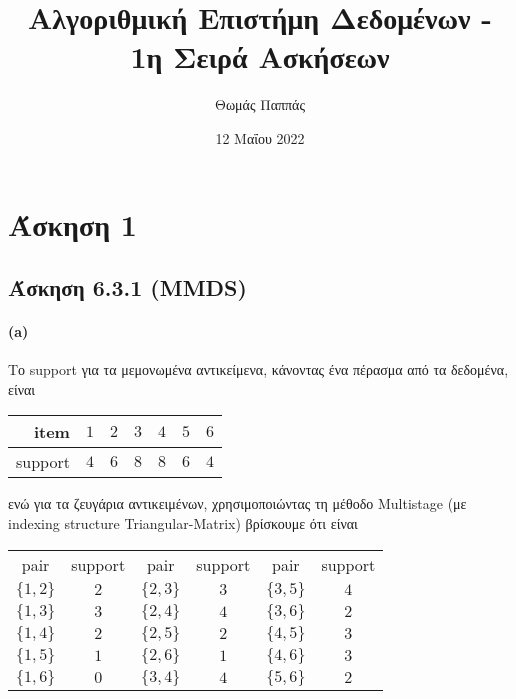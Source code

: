 \documentclass[a4paper,11pt]{article}
\begin{document}
\title{Αλγοριθμική Επιστήμη Δεδομένων - 1η Σειρά Ασκήσεων}
\author{Θωμάς Παππάς}
\date{12 Μαΐου 2022}
\maketitle

\section*{Άσκηση 1}

\subsection*{Άσκηση 6.3.1 (MMDS)}

\paragraph{(a)} Το support για τα μεμονωμένα αντικείμενα, κάνοντας ένα πέρασμα από τα δεδομένα, είναι
\begin{center}
	\begin{tabular}{| r || c | c | c | c | c | c |}
		\hline
		item & $1$ & $2$ & $3$ & $4$ & $5$ & $6$ \\ \hline
		support & $4$ & $6$ & $8$ & $8$ & $6$ & $4$ \\ \hline
	\end{tabular}
\end{center}

ενώ για τα ζευγάρια αντικειμένων, χρησιμοποιώντας τη μέθοδο Multistage (με indexing structure Triangular-Matrix) βρίσκουμε ότι είναι
\begin{center}
	\begin{tabular}{| c | c || c | c || c | c |}
		\hline
		pair & support & pair & support & pair & support \\ \hhline{|=|=#=|=#=|=|}
		$\{1,2\}$ & $2$ & $\{2,3\}$ & $3$ & $\{3,5\}$ & $4$ \\ \hline
		$\{1,3\}$ & $3$ & $\{2,4\}$ & $4$ & $\{3,6\}$ & $2$ \\ \hline
		$\{1,4\}$ & $2$ & $\{2,5\}$ & $2$ & $\{4,5\}$ & $3$ \\ \hline
		$\{1,5\}$ & $1$ & $\{2,6\}$ & $1$ & $\{4,6\}$ & $3$ \\ \hline
		$\{1,6\}$ & $0$ & $\{3,4\}$ & $4$ & $\{5,6\}$ & $2$ \\ \hline
	\end{tabular}
\end{center}
\end{document}
